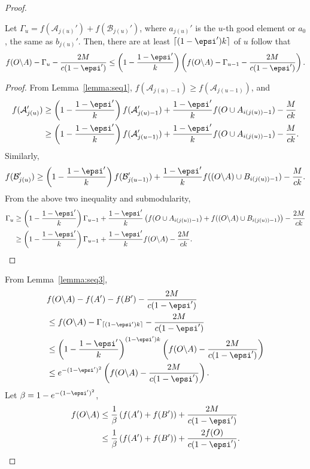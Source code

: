 \begin{proof}
  \begin{lemma} \label{lemma:seq3}
    Let $\Gamma_u=f(\mathcal{A}_{j(u)}')+f(\mathcal{B}_{j(u)}')$, 
    where $a_{j(u)}'$ is the $u$-th
    good element or $a_0$, the same as $b_{j(u)}'$.
    Then, there are at least $\lceil(1-\epsi')k\rceil$ of $u$ follow that
    $$f(O\backslash A)-\Gamma_u-\frac{2M}{c(1-\epsi')}\le 
    \left(1-\frac{1-\epsi'}{k}\right)\left(f(O\backslash A)-\Gamma_{u-1}-\frac{2M}{c(1-\epsi')}\right).$$
  \end{lemma}
  \begin{proof}
    From Lemma~\ref{lemma:seq1}, $f(\mathcal{A}_{j(u)-1})\ge f(\mathcal{A}_{j(u-1)})$, and
    \begin{align*}
      f(\mathcal{A}_{j(u)}')& \ge \left(1-\frac{1-\epsi'}{k}\right)f(\mathcal{A}_{j(u)-1}')+
      \frac{1-\epsi'}{k}f(O\cup A_{i(j(u))-1})-\frac{M}{ck}\\
      &\ge \left(1-\frac{1-\epsi'}{k}\right)f(\mathcal{A}_{j(u-1)}')+
      \frac{1-\epsi'}{k}f(O\cup A_{i(j(u))-1})-\frac{M}{ck}.
    \end{align*}
    Similarly,
    $$f(\mathcal{B}_{j(u)}')\ge \left(1-\frac{1-\epsi'}{k}\right)f(\mathcal{B}_{j(u-1)}')+
    \frac{1-\epsi'}{k}f((O\backslash A)\cup B_{i(j(u))-1})-\frac{M}{ck}.$$
    From the above two inequality and submodularity,
    \begin{align*}
      \Gamma_u&\ge \left(1-\frac{1-\epsi'}{k}\right) \Gamma_{u-1}+
      \frac{1-\epsi'}{k}\left(f(O\cup A_{i(j(u))-1})+f((O\backslash A)\cup B_{i(j(u))-1})\right)-\frac{2M}{ck}\\
      &\ge \left(1-\frac{1-\epsi'}{k}\right) \Gamma_{u-1}+\frac{1-\epsi'}{k} f(O\backslash A)-\frac{2M}{ck}.
    \end{align*}
  \end{proof}

  From Lemma~\ref{lemma:seq3},
  \begin{align*}
    &f(O \backslash A)-f(A')-f(B')-\frac{2M}{c(1-\epsi')} \\
    &\le f(O \backslash A)-\Gamma_{\lceil(1-\epsi')k\rceil}-\frac{2M}{c(1-\epsi')}\\
    &\le \left(1-\frac{1-\epsi'}{k}\right)^{(1-\epsi')k}\left(f(O\backslash A)-\frac{2M}{c(1-\epsi')}\right)\\
    &\le e^{-(1-\epsi')^2}\left(f(O\backslash A)-\frac{2M}{c(1-\epsi')}\right).
  \end{align*}
  Let $\beta=1-e^{-(1-\epsi')^2}$,
  \begin{align*}
    f(O\backslash A)&\le \frac{1}{\beta}\left(f(A')+f(B')\right)+\frac{2M}{c(1-\epsi')}\\
    &\le \frac{1}{\beta}\left(f(A')+f(B')\right)+\frac{2f(O)}{c(1-\epsi')}.
  \end{align*}


\end{proof}
